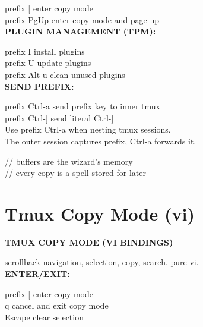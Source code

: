 \documentclass[11pt,a4paper,twoside]{book}
\begin{document}
prefix [              enter copy mode\\
prefix PgUp           enter copy mode and page up\\


\vspace{12pt}
{\bfseries\color{neonyellow} PLUGIN MANAGEMENT (TPM):}\vspace{4pt}

prefix I              install plugins\\
prefix U              update plugins\\
prefix Alt-u          clean unused plugins\\


\vspace{12pt}
{\bfseries\color{neonyellow} SEND PREFIX:}\vspace{4pt}

prefix Ctrl-a         send prefix key to inner tmux\\
prefix Ctrl-]         send literal Ctrl-]\\

Use prefix Ctrl-a when nesting tmux sessions.\\
The outer session captures prefix, Ctrl-a forwards it.\\

\begin{codebox}
\color{neongreen}// buffers are the wizard's memory\\
\color{neongreen}// every copy is a spell stored for later\\
\end{codebox}


\vspace{16pt}

\section{Tmux Copy Mode (vi)}


\vspace{10pt}
{\large\bfseries\color{neoncyan} TMUX COPY MODE (VI BINDINGS)}\vspace{6pt}

scrollback navigation, selection, copy, search. pure vi.\\


\vspace{12pt}
{\bfseries\color{neonyellow} ENTER/EXIT:}\vspace{4pt}

prefix [              enter copy mode\\
q                     cancel and exit copy mode\\
Escape                clear selection\\
\end{document}
